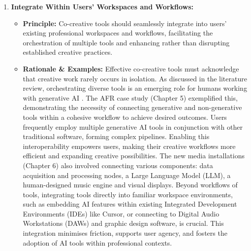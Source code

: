 \begin{enumerate}[label=\arabic*., wide, labelindent=0pt]
\item \textbf{Integrate Within Users' Workspaces and Workflows:}
    \begin{itemize}[label=\textbullet, leftmargin=*]
        \item \textbf{Principle:} Co-creative tools should seamlessly integrate into users' existing professional workspaces and workflows, facilitating the orchestration of multiple tools and enhancing rather than disrupting established creative practices.
        \item \textbf{Rationale \& Examples:} Effective co-creative tools must acknowledge that creative work rarely occurs in isolation. As discussed in the literature review, orchestrating diverse tools is an emerging role for humans working with generative AI \cite{Palani2024-on}. The AFR case study (Chapter 5) exemplified this, demonstrating the necessity of connecting generative and non-generative tools within a cohesive workflow to achieve desired outcomes. Users frequently employ multiple generative AI tools in conjunction with other traditional software, forming complex pipelines. Enabling this interoperability empowers users, making their creative workflows more efficient and expanding creative possibilities. The new media installations (Chapter 6) also involved connecting various components: data acquisition and processing nodes, a Large Language Model (LLM), a human-designed music engine and visual displays. Beyond workflows of tools, integrating tools directly into familiar workspace environments, such as embedding AI features within existing Integrated Development Environments (IDEs) like Cursor, or connecting to Digital Audio Workstations (DAWs) and graphic design software, is crucial. This integration minimises friction, supports user agency, and fosters the adoption of AI tools within professional contexts.
    \end{itemize}


\end{enumerate}
